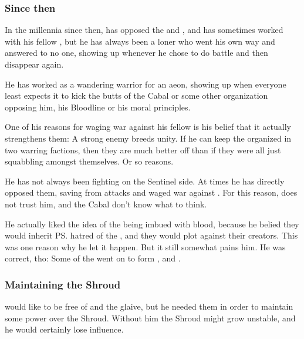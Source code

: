 \subsubsection{Since then}
In the millennia since then, \Ishnaruchaefir{} has opposed the \banes{} and \resphain{}, and has sometimes worked with his fellow \dragons, but he has always been a loner who went his own way and answered to no one, showing up whenever he chose to do battle and then disappear again. 

He has worked as a wandering warrior for an aeon, showing up when everyone least expects it to kick the butts of the Cabal or some other organization opposing him, his Bloodline or his moral principles. 

One of his reasons for waging war against his fellow \dragons{} is his belief that it actually strengthens them: A strong enemy breeds unity. If he can keep the \dragons{} organized in two warring factions, then they are much better off than if they were all just squabbling amongst themselves. Or so \Ishnaruchaefir{} reasons.

He has not always been fighting on the Sentinel side. At times he has directly opposed them, saving \resphain{} from \draconic{} attacks and waged war against \dragons. For this reason, \HriistD{} does not trust him, and the Cabal don't know what to think. 

He actually liked the idea of the \resphain{} being imbued with \draconic{} blood, because he belied they would inherit \ps{\Nexagglachel}{} hatred of the \banes{}, and they would plot against their creators. This was one reason why he let it happen. But it still somewhat pains him. He was correct, tho: Some of the \satharioth{} went on to form \Kezerad, \Mystraacht{} and \Baelzerach. 






\subsubsection{Maintaining the Shroud}
\Ishnaruchaefir would like to be free of \Rystessakhin and the glaive, but he needed them in order to maintain some power over the Shroud.
Without him the Shroud might grow unstable, and he would certainly lose influence.

